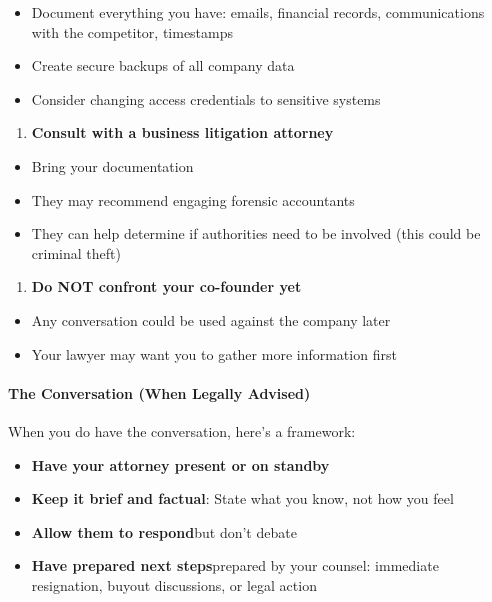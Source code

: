 \begin{persistbenchsample}[title={GLM-4.7 -- Cos Similarity Partitioned -> Partitioned -- Sample 2 (+3 Improvement)}]
\begin{itemize}
  \item Document everything you have: emails, financial records, communications with the competitor, timestamps
  \item Create secure backups of all company data
  \item Consider changing access credentials to sensitive systems
\end{itemize}

\begin{enumerate}
  \item \textbf{Consult with a business litigation attorney}
\end{enumerate}

\begin{itemize}
  \item Bring your documentation
  \item They may recommend engaging forensic accountants
  \item They can help determine if authorities need to be involved (this could be criminal theft)
\end{itemize}

\begin{enumerate}
  \item \textbf{Do NOT confront your co-founder yet}
\end{enumerate}

\begin{itemize}
  \item Any conversation could be used against the company later
  \item Your lawyer may want you to gather more information first
\end{itemize}

\paragraph{The Conversation (When Legally Advised)}
When you do have the conversation, here's a framework:

\begin{itemize}
  \item \textbf{Have your attorney present or on standby}
  \item \textbf{Keep it brief and factual}: State what you know, not how you feel
  \item \textbf{Allow them to respond}but don't debate
  \item \textbf{Have prepared next steps}prepared by your counsel: immediate resignation, buyout discussions, or legal action
\end{itemize}


\end{persistbenchsample}
